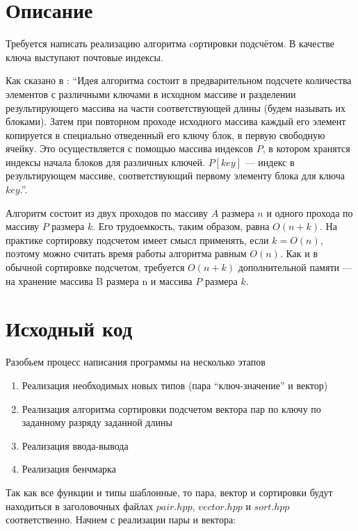 \section{Описание}
Требуется написать реализацию алгоритма cортировки подсчётом. В качестве ключа выступают почтовые индексы.

Как сказано в \cite{wikipedia_itmo_sort}: \enquote{Идея алгоритма состоит в предварительном подсчете количества элементов с различными ключами в исходном массиве и разделении результирующего массива на части соответствующей длины (будем называть их блоками). Затем при повторном проходе исходного массива каждый его элемент копируется в специально отведенный его ключу блок, в первую свободную ячейку. Это осуществляется с помощью массива индексов $P$, в котором хранятся индексы начала блоков для различных ключей. $P[key]$ — индекс в результирующем массиве, соответствующий первому элементу блока для ключа $key$.}.

Алгоритм состоит из двух проходов по массиву $A$ размера $n$ и одного прохода по массиву $P$ размера $k$. Его трудоемкость, таким образом, равна $O(n+k)$. На практике сортировку подсчетом имеет смысл применять, если $k=O(n)$, поэтому можно считать время работы алгоритма равным $O(n)$.
Как и в обычной сортировке подсчетом, требуется $O(n+k)$ дополнительной памяти — на хранение массива B размера n и массива $P$ размера $k$.

\pagebreak

\section{Исходный код}
Разобьем процесс написания программы на несколько этапов

\begin{enumerate}
    \item Реализация необходимых новых типов (пара \enquote{ключ-значение} и вектор)
    \item Реализация алгоритма сортировки подсчетом вектора пар по ключу по заданному разряду заданной длины
    \item Реализация ввода-вывода
    \item Реализация бенчмарка
\end{enumerate}

Так как все функции и типы шаблонные, то пара, вектор и сортировки будут находиться в заголовочных файлах $pair.hpp$, $vector.hpp$ и $sort.hpp$ соответственно.
Начнем с реализации пары и вектора:

